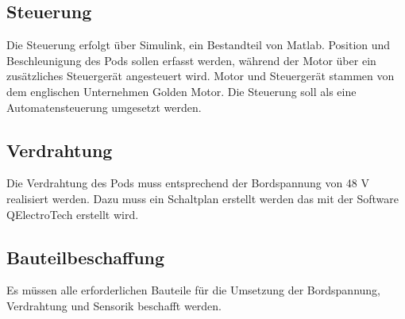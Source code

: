 \subsection{Steuerung}
Die Steuerung erfolgt über Simulink, ein Bestandteil von Matlab. Position und Beschleunigung des Pods sollen erfasst werden, während der Motor über ein zusätzliches Steuergerät angesteuert wird. Motor und Steuergerät stammen von dem englischen Unternehmen Golden Motor. Die Steuerung soll als eine Automatensteuerung umgesetzt werden.

\subsection{Verdrahtung}
Die Verdrahtung des Pods muss entsprechend der Bordspannung von 48 V realisiert werden. Dazu muss ein Schaltplan erstellt werden das mit der Software QElectroTech erstellt wird.

\subsection{Bauteilbeschaffung}
Es müssen alle erforderlichen Bauteile für die Umsetzung der Bordspannung, Verdrahtung und Sensorik beschafft werden.



\pagebreak

